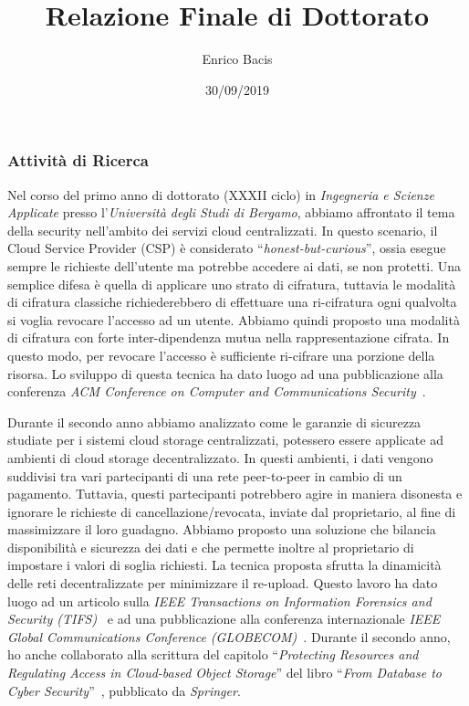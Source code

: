 \documentclass{article}
\begin{document}
\title{Relazione Finale di Dottorato}
\author{Enrico Bacis}
\date{30/09/2019}

\maketitle

\vspace{40px}

\subsubsection*{Attività di Ricerca}

Nel corso del primo anno di dottorato (XXXII ciclo) in {\em Ingegneria e Scienze Applicate} presso l'{\em Università degli Studi di Bergamo}, abbiamo affrontato il tema della security nell'ambito dei servizi cloud centralizzati. In questo scenario, il Cloud Service Provider (CSP) è considerato ``{\em honest-but-curious}'', ossia esegue sempre le richieste dell'utente ma potrebbe accedere ai dati, se non protetti. Una semplice difesa è quella di applicare uno strato di cifratura, tuttavia le modalità di cifratura classiche richiederebbero di effettuare una ri-cifratura ogni qualvolta si voglia revocare l'accesso ad un utente. Abbiamo quindi proposto una modalità di cifratura con forte inter-dipendenza mutua nella rappresentazione cifrata. In questo modo, per revocare l'accesso è sufficiente ri-cifrare una porzione della risorsa. Lo sviluppo di questa tecnica ha dato luogo ad una pubblicazione alla conferenza {\em ACM Conference on Computer and Communications Security}~\cite{ccs}.

\medskip
\noindent Durante il secondo anno abbiamo analizzato come le garanzie di sicurezza studiate per i sistemi cloud storage centralizzati, potessero essere applicate ad ambienti di cloud storage decentralizzato. In questi ambienti, i dati vengono suddivisi tra vari partecipanti di una rete peer-to-peer in cambio di un pagamento. Tuttavia, questi partecipanti potrebbero agire in maniera disonesta e ignorare le richieste di cancellazione/revocata, inviate dal proprietario, al fine di massimizzare il loro guadagno.
Abbiamo proposto una soluzione che bilancia disponibilità e sicurezza dei dati e che permette inoltre al proprietario di impostare i valori di soglia richiesti. La tecnica proposta sfrutta la dinamicità delle reti decentralizzate per minimizzare il re-upload.
Questo lavoro ha dato luogo ad un articolo sulla {\em IEEE Transactions on Information Forensics and Security (TIFS)}~\cite{tifs} e ad una pubblicazione alla conferenza internazionale {\em  IEEE Global Communications Conference (GLOBECOM)}~\cite{globecom}.
Durante il secondo anno, ho anche collaborato alla scrittura del capitolo ``{\em Protecting Resources and Regulating Access in Cloud-based Object Storage}'' del libro ``{\em From Database to Cyber Security}''~\cite{sushil}, pubblicato da {\em Springer}.
\end{document}
